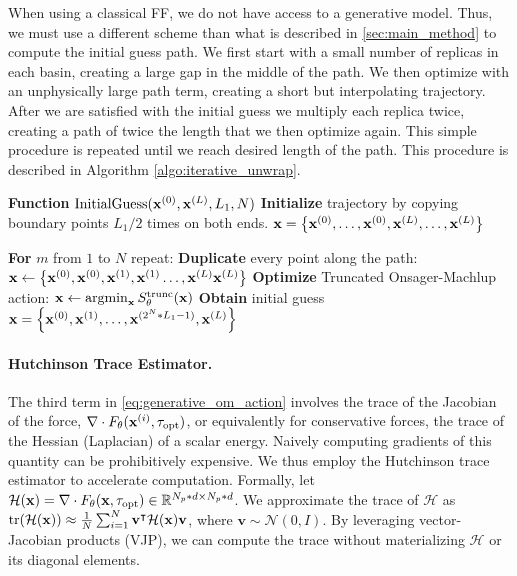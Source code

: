 When using a classical FF, we do not have access to a generative model. Thus, we must use a different scheme than what is described in \ref{sec:main_method} to compute the initial guess path. We first start with a small number of replicas in each basin, creating a large gap in the middle of the path. We then optimize with an unphysically large path term, creating a short but interpolating trajectory. After we are satisfied with the initial guess we multiply each replica twice, creating a path of twice the length that we then optimize again. This simple procedure is repeated until we reach desired length of the path. This procedure is described in Algorithm \ref{algo:iterative_unwrap}. 

\begin{algorithm}
\caption{Initial Guess Path Generation with Iterative Unwrapping}
\label{algo:iterative_unwrap}
\begin{algorithmic}[1]
\STATE \textbf{Function} $\text{InitialGuess}(\mathbf{x}^{(0)}, \mathbf{x}^{(L)}, L_1, N)$
\STATE \textbf{Initialize} trajectory by copying boundary points $L_1/2$ times on both ends.
\STATE $\mathbf{x} = \left\{\mathbf{x}^{(0)}, \dots, \mathbf{x}^{(0)}, \mathbf{x}^{(L)}, \dots, \mathbf{x}^{(L)}\right\}$

\STATE \textbf{For} $m$ from $1$ to $N$ repeat:
\STATE \quad \textbf{Duplicate} every point along the path: $\mathbf{x} \leftarrow \left\{\mathbf{x}^{(0)}, \mathbf{x}^{(0)}, \mathbf{x}^{(1)}, \mathbf{x}^{(1)} \dots, \mathbf{x}^{(L)} \mathbf{x}^{(L)}\right\}$
\STATE \quad \textbf{Optimize} Truncated Onsager-Machlup action: $\xx \leftarrow \argmin_\xx S_\theta^{\text{trunc}}(\xx)$
\STATE \textbf{Obtain} initial guess $\mathbf{x} = \left\{\mathbf{x}^{(0)},\mathbf{x}^{(1)}, \dots, \mathbf{x}^{(2^N * L_1-1)}, \mathbf{x}^{(L)}\right\}$
\end{algorithmic}
\end{algorithm}
\paragraph{Hutchinson Trace Estimator.}
The third term in \eqref{eq:generative_om_action} involves the trace of the Jacobian of the force, $\nabla \cdot {F_\theta}(\mathbf{x}^{(i)},\tau_\text{opt} )$, or equivalently for conservative forces, the trace of the Hessian (Laplacian) of a scalar energy. Naively computing gradients of this quantity can be prohibitively expensive. We thus employ the Hutchinson trace estimator \cite{hutchinson1989stochastic} to accelerate computation. Formally, let $\mathcal{H}(\mathbf{x}) = \nabla \cdot F_\theta(\mathbf{x},\tau_\text{opt} ) \in \mathbb{R}^{N_p \ast d \times N_p \ast d}$. We approximate the trace of $\mathcal{H}$ as $\operatorname{tr}(\mathcal{H}(\mathbf{x})) \approx \frac{1}{N} \sum_{i=1}^N \mathbf{v}^\intercal \mathcal{H}(\mathbf{x}) \mathbf{v}$, where $\mathbf{v} \sim \mathcal{N}(0, I)$. By leveraging vector-Jacobian products (VJP), we can compute the trace without materializing $\mathcal{H}$ or its diagonal elements. 

